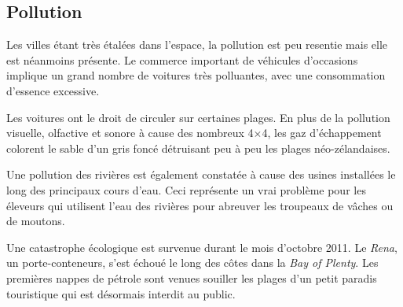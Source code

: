 \documentclass[11pt,journal]{RapportFR}
\newcommand{\Nz}{Nouvelle-Z\'elande\xspace}
\newcommand{\nzes}{n\'eo-z\'elandaises\xspace}
\newcommand{\Nzs}{N\'eo-Z\'elandais\xspace}
\begin{document}





\subsection{Pollution}
\label{sub:pollution}

Les villes \'etant tr\`es \'etal\'ees dans l'espace, la pollution est peu resentie mais elle est n\'eanmoins pr\'esente.
Le commerce important de v\'ehicules d'occasions implique un grand nombre de voitures tr\`es polluantes, avec une consommation d'essence excessive.

Les voitures ont le droit de circuler sur certaines plages. En plus de la pollution visuelle, olfactive et sonore \`a cause des nombreux 4$\times$4, les gaz d'\'echappement colorent le sable d'un gris fonc\'e d\'etruisant peu \`a peu les plages \nzes.

Une pollution des rivi\`eres est \'egalement constat\'ee \`a cause des usines install\'ees le long des principaux cours d'eau. 
Ceci repr\'esente un vrai probl\`eme pour les \'eleveurs qui utilisent l'eau des rivi\`eres pour abreuver les troupeaux de v\^aches ou de moutons.

Une catastrophe \'ecologique est survenue durant le mois d'octobre 2011.
Le \emph{Rena}, un porte-conteneurs, s'est \'echou\'e le long des c\^otes dans la \emph{Bay of Plenty}.
Les premi\`eres nappes de p\'etrole sont venues souiller les plages d'un petit paradis touristique qui est d\'esormais interdit au public.
\end{document}
